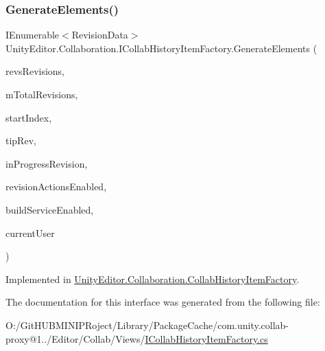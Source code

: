 \subsubsection{\texorpdfstring{GenerateElements()}{GenerateElements()}}
{\footnotesize\ttfamily I\+Enumerable$<$Revision\+Data$>$ Unity\+Editor.\+Collaboration.\+I\+Collab\+History\+Item\+Factory.\+Generate\+Elements (\begin{DoxyParamCaption}\item[{I\+Enumerable$<$ Revision $>$}]{revs\+Revisions,  }\item[{int}]{m\+Total\+Revisions,  }\item[{int}]{start\+Index,  }\item[{string}]{tip\+Rev,  }\item[{string}]{in\+Progress\+Revision,  }\item[{bool}]{revision\+Actions\+Enabled,  }\item[{bool}]{build\+Service\+Enabled,  }\item[{string}]{current\+User }\end{DoxyParamCaption})}



Implemented in \mbox{\hyperlink{class_unity_editor_1_1_collaboration_1_1_collab_history_item_factory_addc7995a699cc3f134fdc0381ee8569d}{Unity\+Editor.\+Collaboration.\+Collab\+History\+Item\+Factory}}.



The documentation for this interface was generated from the following file\+:\begin{DoxyCompactItemize}
\item 
O\+:/\+Git\+H\+U\+B\+M\+I\+N\+I\+P\+Roject/\+Library/\+Package\+Cache/com.\+unity.\+collab-\/proxy@1../\+Editor/\+Collab/\+Views/\mbox{\hyperlink{_i_collab_history_item_factory_8cs}{I\+Collab\+History\+Item\+Factory.\+cs}}\end{DoxyCompactItemize}
